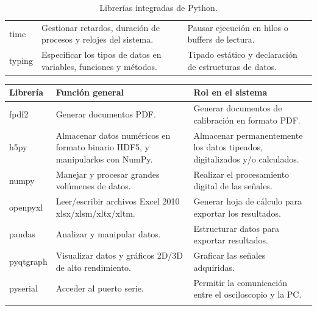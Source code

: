 \begin{table}[H]
\begin{tabularx}{\textwidth}{lXX}
        time       & Gestionar retardos, duración de procesos y relojes del sistema.   & Pausar ejecución en hilos o buffers de lectura.                          \\ \addlinespace
        typing     & Especificar los tipos de datos en variables, funciones y métodos. & Tipado estático y declaración de estructuras de datos.                   \\ \bottomrule
    \end{tabularx}
    \caption{Librerías integradas de Python.}
    \label{Tab:LibreriasIntegradas}
\end{table}

\begin{table}[H]
    \centering
    \begin{tabularx}{\textwidth}{lXX}
        \toprule
        \textbf{Librería} & \textbf{Función general} & \textbf{Rol en el sistema} \\ \midrule
        fpdf2      & Generar documentos PDF.                                                                               & Generar documentos de calibración en formato PDF.                                    \\ \addlinespace
        h5py       & Almacenar datos numéricos en formato binario HDF5, y manipularlos con NumPy.                          & Almacenar permanentemente los datos tipeados, digitalizados y/o calculados.          \\ \addlinespace
        numpy      & Manejar y procesar grandes volúmenes de datos.                                                        & Realizar el procesamiento digital de las señales.                                    \\ \addlinespace
        openpyxl   & Leer/escribir archivos Excel 2010 xlsx/xlsm/xltx/xltm.                                                & Generar hoja de cálculo para exportar los resultados.                                \\ \addlinespace
        pandas     & Analizar y manipular datos.                                                                           & Estructurar datos para exportar resultados.                                          \\ \addlinespace
        pyqtgraph  & Visualizar datos y gráficos 2D/3D de alto rendimiento.                                                & Graficar las señales adquiridas.                                                     \\ \addlinespace
        pyserial   & Acceder al puerto serie.                                                                              & Permitir la comunicación entre el osciloscopio y la PC.                              \\ \addlinespace

\end{tabularx}
\end{table}
